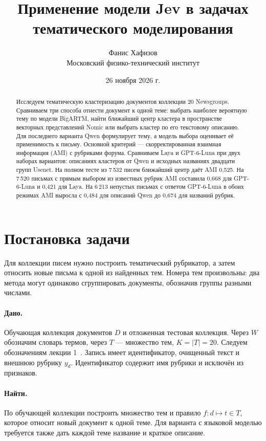 \documentclass[11pt,a4paper]{article}
\title{Применение модели Jev в задачах тематического моделирования}
\author{Фанис Хафизов\\[2pt]\small Московский физико-технический институт}
\date{26 ноября 2026 г.}
\begin{document}
\maketitle
\begin{abstract}
Исследуем тематическую кластеризацию документов коллекции 20 Newsgroups. Сравниваем три способа отнести документ к одной теме: выбрать наиболее вероятную тему по модели BigARTM, найти ближайший центр кластера в пространстве векторных представлений Nomic или выбрать кластер по его текстовому описанию. Для последнего варианта Qwen формулирует тему, а модель выбора оценивает её применимость к письму. Основной критерий --- скорректированная взаимная информация (AMI) с рубриками форума. Сравниваем Laya и GPT-6-Luna при двух наборах вариантов: описаниях кластеров от Qwen и исходных названиях двадцати групп Usenet. На полном тесте из 7\,532 писем ближайший центр даёт AMI 0,525. На 7\,520 письмах с прямым выбором из известных рубрик AMI составила 0,668 для GPT-6-Luna и 0,421 для Laya. На 6\,213 непустых письмах с ответом GPT-6-Luna в обоих режимах AMI выросла с 0,484 для описаний Qwen до 0,674 для названий рубрик.
\end{abstract}

\section{Постановка задачи}
Для коллекции писем нужно построить тематический рубрикатор, а затем относить новые письма к одной из найденных тем. Номера тем произвольны: два метода могут одинаково сгруппировать документы, обозначив группы разными числами.
\paragraph{Дано.} Обучающая коллекция документов $D$ и отложенная тестовая коллекция. Через $W$ обозначим словарь термов, через $T$ --- множество тем, $K=|T|=20$. Следуем обозначениям лекции 1~\cite{course}. Запись имеет идентификатор, очищенный текст и внешнюю рубрику $y_d$. Идентификатор содержит имя рубрики и исключён из признаков.
\paragraph{Найти.} По обучающей коллекции построить множество тем и правило $f\colon d\mapsto t\in T$, которое относит новый документ к одной теме. Для варианта с языковой моделью требуется также дать каждой теме название и краткое описание.
\end{document}
